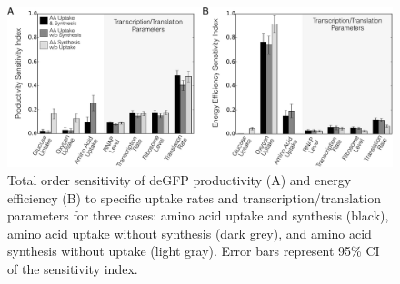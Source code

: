\documentclass[journal=asbcd6,manuscript=article]{achemso}
\begin{document}
\begin{figure}[t!]
\includegraphics[width=1.00\textwidth]{./Figures/Sensitivity.pdf}
\caption{Total order sensitivity of deGFP productivity (A) and energy efficiency (B) to specific uptake rates and transcription/translation parameters for three cases: amino acid uptake and synthesis (black), amino acid uptake without synthesis (dark grey), and amino acid synthesis without uptake (light gray). Error bars represent 95\% CI of the sensitivity index.}
\label{fig:SI}
\end{figure}
\end{document}

